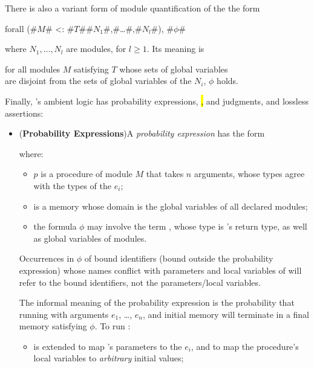 There is also a variant form of module quantification of the
the form
\begin{easycrypt}{}{}
forall (#$M$# <: #$T$#{#$N_1$#,#\ldots#,#$N_l$#}), #$\phi$#
\end{easycrypt}
where $N_1,\ldots,N_l$ are modules, for $l\geq 1$. Its meaning is
\begin{center}
  for all modules $M$ satisfying $T$ whose sets of global
  variables\\are disjoint from the sets of global variables of the
  $N_i$, $\phi$ holds.
\end{center}

Finally, \EasyCrypt's ambient logic has probability expressions, \hl,
\phl and \prhl judgments, and lossless assertions:
\begin{itemize}
\item (\textbf{Probability Expressions})\quad A \emph{probability expression}
  has the form
  \begin{center}
  \end{center}
where:
\begin{itemize}
\item $p$ is a procedure of module $M$ that takes $n$ arguments, whose
types agree with the types of the $e_i$;

\item {} is a memory whose domain is the global variables
  of all declared modules;

\item the formula $\phi$ may involve the term , whose
  type is 's return type, as well as global variables
  of modules.
\end{itemize}
Occurrences in $\phi$ of bound identifiers (bound outside the
probability expression) whose names conflict with parameters and local
variables of  will refer to the bound identifiers, not the
parameters/local variables.

The informal meaning of the probability expression is
the probability that running  with arguments
$e_1$, \ldots, $e_n$, and initial memory  will terminate
in a final memory satisfying $\phi$. To run :
\begin{itemize}
\item {} is extended to map 's parameters to the
 $e_i$, and to map the procedure's local variables to \emph{arbitrary}
 initial values;


\end{itemize}
\end{itemize}
